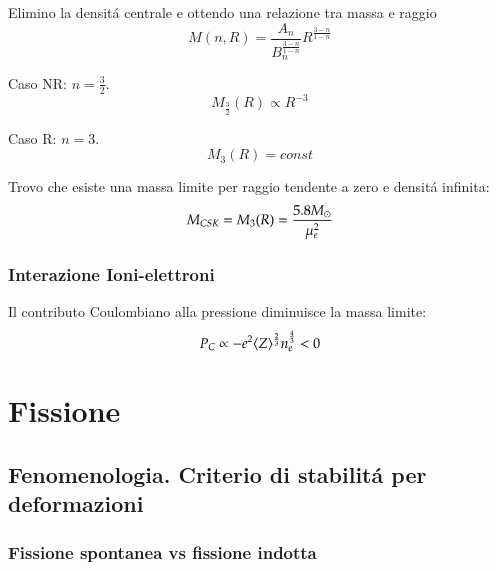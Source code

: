 Elimino la densit\'a centrale e ottendo una relazione tra massa e raggio
\begin{equation*}
M(n,R)=\frac{A_n}{B_n^{\frac{3-n}{1-n}}}R^{\frac{3-n}{1-n}}
\end{equation*}

\begin{itemize*}
\item Caso NR: $n=\frac{3}{2}$.
\begin{equation*}
M_{\frac{3}{2}}(R)\propto R^{-3}
\end{equation*}
\item Caso R: $n=3$.
\begin{equation*}
M_3(R)=const
\end{equation*}
\end{itemize*}

Trovo che esiste una massa limite per raggio tendente a zero e densit\'a infinita:
\begin{equation*}
M_{CSK}=M_3(R)=\frac{5.8M_{\odot}}{\mu_e^2}
\end{equation*}

\subsection{Interazione Ioni-elettroni}
Il contributo Coulombiano alla pressione diminuisce la massa limite:
\begin{equation*}
P_C\propto-e^2\langle Z \rangle^{\frac{2}{3}}n_e^{\frac{4}{3}}<0
\end{equation*}

%

\chapter{Fissione}

\section{Fenomenologia. Criterio di stabilit\'a per deformazioni}

\subsection{Fissione spontanea vs fissione indotta}

